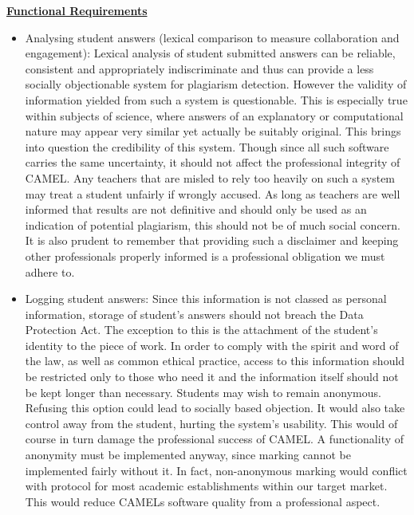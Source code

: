 	\underline{\textbf{Functional Requirements}}
	\begin{itemize}
		\item Analysing student answers (lexical comparison to measure collaboration and engagement): Lexical analysis of student submitted answers can be reliable, consistent and appropriately indiscriminate and thus can provide a less socially objectionable system for plagiarism detection.
			However the validity of information yielded from such a system is questionable. This is especially true within subjects of science, where answers of an explanatory or computational nature may appear very similar yet actually be suitably original. This brings into question the credibility of this system. Though since all such software carries the same uncertainty, it should not affect the professional integrity of CAMEL.
			Any teachers that are misled to rely too heavily on such a system may treat a student unfairly if wrongly accused. As long as teachers are well informed that results are not definitive and should only be used as an indication of potential plagiarism, this should not be of much social concern. It is also prudent to remember that providing such a disclaimer and keeping other professionals properly informed is a professional obligation we must adhere to.

		\item Logging student answers: Since this information is not classed as personal information, storage of student’s answers should not breach the Data Protection Act. The exception to this is the attachment of the student’s identity to the piece of work. In order to comply with the spirit and word of the law, as well as common ethical practice, access to this information should be restricted only to those who need it and the information itself should not be kept longer than necessary.
			Students may wish to remain anonymous. Refusing this option could lead to socially based objection. It would also take control away from the student, hurting the system’s usability. This would of course in turn damage the professional success of CAMEL.
			A functionality of anonymity must be implemented anyway, since marking cannot be implemented fairly without it. In fact, non-anonymous marking would conflict with protocol for most academic establishments within our target market. This would reduce CAMELs software quality from a professional aspect.


\end{itemize}
